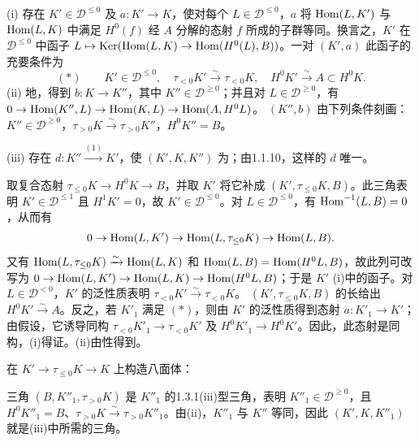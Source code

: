 (i) 存在 $K'\in\mathcal D^{\leq0}$ 及 $a:K'\to K$，使对每个 $L\in\mathcal D^{\leq0}$，$a$ 将 $\operatorname{Hom}(L,K')$ 与 $\operatorname{Hom}(L,K)$ 中满足 $H^0(f)$ 经 $A$ 分解的态射 $f$ 所成的子群等同。换言之，$K'$ 在 $\mathcal D^{\leq0}$ 中函子 $L\mapsto\operatorname{Ker}(\operatorname{Hom}(L,K)\to\operatorname{Hom}(H^0(L),B))$。一对 $(K',a)$ 此函子的充要条件为
\[
 (*)\qquad K'\in\mathcal D^{\leq0},\quad \tau_{<0}K'\xrightarrow{\sim}\tau_{<0}K,
 \quad H^0K'\xrightarrow{\sim}A\subset H^0K.
\]
(ii) 地，得到 $b:K\to K''$，其中 $K''\in\mathcal D^{\geq0}$；并且对 $L\in\mathcal D^{\geq0}$，有 $0\to\operatorname{Hom}(K'',L)\to\operatorname{Hom}(K,L)\to\operatorname{Hom}(A,H^0L)$。
$(K'',b)$ 由下列条件刻画：$K''\in\mathcal D^{\geq0}$，$\tau_{>0}K\xrightarrow{\sim}\tau_{>0}K''$，$H^0K''=B$。

(iii) 存在 $d:K''\xrightarrow{(1)}K'$，使 $(K',K,K'')$ 为；由1.1.10，这样的 $d$ 唯一。

取复合态射 $\tau_{\leq0}K\to H^0K\to B$，并取 $K'$ 将它补成 $(K',\tau_{\leq0}K,B)$。此三角表明 $K'\in\mathcal D^{\leq1}$ 且 $H^1K'=0$，故 $K'\in\mathcal D^{\leq0}$。对 $L\in\mathcal D^{\leq0}$，有 $\operatorname{Hom}^{-1}(L,B)=0$，从而有
\[
 0\to\operatorname{Hom}(L,K')\to\operatorname{Hom}(L,\tau_{\leq0}K)\to\operatorname{Hom}(L,B).
\]
又有 $\operatorname{Hom}(L,\tau_{\leq0}K)\xrightarrow{\sim}\operatorname{Hom}(L,K)$ 和 $\operatorname{Hom}(L,B)=\operatorname{Hom}(H^0L,B)$，故此列可改写为 $0\to\operatorname{Hom}(L,K')\to\operatorname{Hom}(L,K)\to\operatorname{Hom}(H^0L,B)$；于是 $K'$ (i)中的函子。对 $L\in\mathcal D^{<0}$，$K'$ 的泛性质表明 $\tau_{<0}K'\xrightarrow{\sim}\tau_{<0}K$。 $(K',\tau_{\leq0}K,B)$ 的长给出 $H^0K'\xrightarrow{\sim}A$。反之，若 $K'_1$ 满足 $(*)$，则由 $K'$ 的泛性质得到态射 $a:K'_1\to K'$；由假设，它诱导同构 $\tau_{<0}K'_1\to\tau_{<0}K'$ 及 $H^0K'_1\to H^0K'$。因此，此态射是同构，(i)得证。(ii)由性得到。

在 $K'\to\tau_{\leq0}K\to K$ 上构造八面体：
\begin{center}
\end{center}
三角 $(B,K''_1,\tau_{>0}K)$ 是 $K''_1$ 的1.3.1(iii)型三角，表明 $K''_1\in\mathcal D^{\geq0}$，且 $H^0K''_1=B$、$\tau_{>0}K\xrightarrow{\sim}\tau_{>0}K''_1$。由(ii)，$K''_1$ 与 $K''$ 等同，因此 $(K',K,K''_1)$ 就是(iii)中所需的三角。

